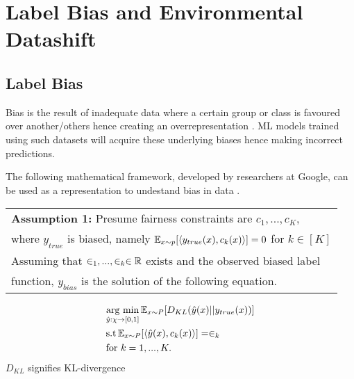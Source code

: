\chapter{Label Bias and Environmental Datashift}
\label{chap:chap3}
\section*{Label Bias}
Bias is the result of inadequate data where a certain group or class is favoured over another/others hence creating an overrepresentation \cite{Jiang}\cite{saria2019tutorial}.
ML models trained using such datasets will acquire these underlying biases hence making incorrect predictions.

The following mathematical framework, developed by researchers at Google, can be used as a representation to undestand bias in data \cite{Jiang}.

\bigskip
\begin{center}
    \begin{tabular}{l}
        \textbf{Assumption 1: }Presume fairness constraints are $c_1, ..., c_K$,\\
        where $y_{true}$ is biased, namely $\operatorname{\mathbb{E}}_{x\sim p}[\langle y_{true}(x), c_k(x)\rangle] = 0$ for $k \in [K]$\\
        Assuming that $\in_1, ..., \in_k \in \mathbb{R}$ exists and the observed biased label \\
        function, $y_{bias}$ is the solution of the following equation.
    \end{tabular}

    \begin{equation}
        \label{eq:assumption}
        \begin{split}
            & \underset{\hat{y}:\chi\rightarrow[0,1]}{\text{arg min}}  \operatorname{\mathbb{E}}_{x\sim P}[D_{KL}(\hat{y}(x)||y_{true}(x))]\\
            & \text{s.t} \operatorname{\mathbb{E}}_{x\sim P}[\langle\hat{y}(x),c_k(x)\rangle] = \in_k \\
            & \text{for } k = 1, ..., K.
        \end{split}
    \end{equation}
    $D_{KL}$ signifies KL-divergence
\end{center}

